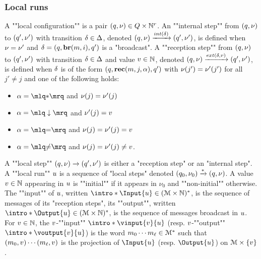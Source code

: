 \subsubsection{Local runs}
\AP A ""local configuration"" is a pair $(q, \nu) \in Q \times \mathbb{N}^r$.  
\AP An ""internal step"" from $(q,\nu)$ to $(q',\nu')$ with transition $\delta \in \Delta$, denoted $(q,\localdata) \intstep{\atrans} (q',\localdata')$, is defined when $\nu = \nu'$ and $\delta =(q, \textbf{br}(m, i), q')$ is a "broadcast".  
\AP A ""reception step"" from $(q,\nu)$ to $(q',\nu')$ with transition $\delta \in \Delta$ and value $v \in \mathbb{N}$, denoted $(q,\localdata) \extbr{\atrans}{\aval} (q',\localdata')$, is defined when $\delta$ is of the form $(q,\textbf{rec}(m, j, \alpha),q')$ with $\nu(j') = \nu'(j')$ for all $j' \neq j$ and one of the following holds:
	
	\begin{minipage}[t]{6cm}
		\begin{itemize}
			\item $\anact = \quotemarks{\dummyact}$ 
			and $\nu(j) = \nu'(j)$
			\item $\anact = \quotemarks{\enregact}$ and $\nu'(j) = v$
		\end{itemize}
	\end{minipage}
	\begin{minipage}[t]{6cm}
		\begin{itemize}
			\item $\anact = \quotemarks{\eqtestact}$ and $\nu(j) = \nu'(j)= v$
			\item $\anact = \quotemarks{\diseqtestact}$ and $\nu(j) = \nu'(j) \ne v$.
		\end{itemize}
	\end{minipage}
	

	\AP A ""local step"" $(q,\nu) \xrightarrow{} (q',\nu')$ is either a "reception step" or an "internal step". 
	\AP A ""local run"" $u$ is a sequence of "local steps" denoted $(q_0, \nu_0) \xrightarrow{*} (q, \nu)$.
	A value $v \in \mathbb{N}$ appearing in $u$ is ""initial"" if it appears in $\nu_0$ and ""non-initial"" otherwise. 
	The ""input"" of $u$, written $\intro*\Input{\localrun} \in (\messages \times \nats)^*$, is the sequence of messages of its "reception steps", its ""output"", written $\intro*\Output{\localrun} \in (\messages \times \nats)^*$, is the sequence of messages broadcast in $u$. 
	For $v \in \mathbb{N}$, the $v$-""input"" $\intro*\vinput{\aval}{\localrun}$ (resp. $v$-""output"" $\intro*\voutput{\aval}{\localrun}$) is the word $m_0 \cdots m_{\ell} \in \mathcal{M}^*$ such that $(m_0, v) \cdots (m_{\ell}, v)$ is the projection of $\Input{\localrun}$ (resp. $\Output{\localrun}$) on $\mathcal{M} \times \{v\}$. 
 
